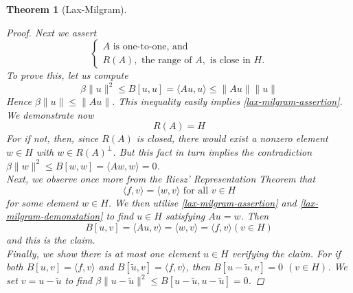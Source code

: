 \documentclass[fontsize=14pt,a4paper,DIV=1]{scrartcl}
\newtheorem{theorem}{Theorem}[section]
\numberwithin{equation}{section}
\begin{document}
\begin{theorem}[Lax-Milgram]
\begin{proof}
	Next we assert
	\begin{equation}
		\begin{cases} A \text{ is one-to-one, and} \\ R(A), \text{ the range of } A, \text{ is close in } H. \end{cases} \label{lax-milgram-assertion}
	\end{equation} 
	To prove this, let us compute
		\[ \beta \| u \|^{2} \leq B[u, u] = \langle Au, u \rangle \leq \| Au \| \| u \| \]
	Hence $\beta \| u \| \leq \| Au \|$. This inequality easily implies \eqref{lax-milgram-assertion}. \\
	We demonstrate now
		\begin{equation}
			R(A) = H \label{lax-milgram-demonstation}
		\end{equation} 
		For if not, then, since $R(A)$ is closed, there would exist a nonzero element $w \in H$ with $w \in R(A)^{\bot}$. But this fact in turn implies the contradiction $\beta \| w \|^{2} \leq B[w, w] = \langle A w , w \rangle = 0$. \\
	Next, we observe once more from the Riesz' Representation Theorem that
		\[ \langle f, v \rangle = \langle w , v \rangle \text{ for all } v \in H \]
	for some element $w \in H$. We then utilise \eqref{lax-milgram-assertion} and \eqref{lax-milgram-demonstation} to find $u \in H$ satisfying $A u  = w$. Then 
		\[ B[u, v] = \langle A u, v \rangle = \langle w, v \rangle = \langle f, v \rangle (v \in H) \]
	and this is the claim. \\
	
	Finally, we show there is at most one element $u \in H$ verifying the claim. For if both $B[u, v] = \langle f, v \rangle$ and $B[\tilde{u}, v] = \langle f, v \rangle$, then $B[u - \tilde{u}, v] = 0$ $(v \in H)$. We set $v = u - \tilde{u}$ to find $\beta \| u - \tilde{u}\|^{2} \leq B[u - \tilde{u}, u - \tilde{u}] = 0$.
	\end{proof}
\end{theorem}
\end{document}
